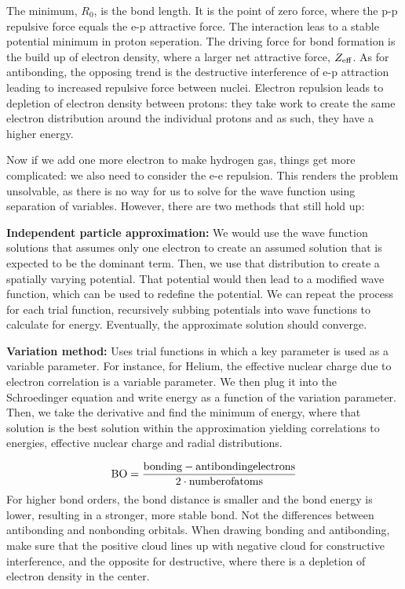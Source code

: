 \documentclass[11pt,fleqn]{book}
\begin{document}
The minimum, $R_0$, is the bond length. It is the point of zero force, where the p-p repulsive force equals the e-p attractive force. The interaction leas to a stable potential minimum in  proton seperation. The driving force for bond formation is the build up of electron density, where a larger net attractive force, $Z_{\rm eff}$. As for antibonding, the opposing trend is the destructive interference of e-p attraction leading to increased repulsive force between nuclei. Electron repulsion leads to depletion of electron density between protons: they take work to create the same electron distribution around the individual protons and as such, they have a higher energy.

Now if we add one more electron to make hydrogen gas, things get more complicated: we also need to consider the e-e repulsion. This renders the problem unsolvable, as there is no way for us to solve for the wave function using separation of variables. However, there are two methods that still hold up:

\textbf{Independent particle approximation: }We would use the wave function solutions that assumes only one electron to create an assumed solution that is expected to be the dominant term. Then, we use that distribution to create a spatially varying potential. That potential would then lead to a modified wave function, which can be used to redefine the potential. We can repeat the process for each trial function, recursively subbing potentials into wave functions to calculate for energy. Eventually, the approximate solution should converge.

\textbf{Variation method: }Uses trial functions in which a key parameter is used as a variable parameter. For instance, for Helium, the effective nuclear charge due to electron correlation is a variable parameter. We then plug it into the Schroedinger equation and write energy as a function of the variation parameter. Then, we take the derivative and find the minimum of energy, where that solution is the best solution within the approximation yielding correlations to energies, effective nuclear charge and radial distributions.

\begin{theorem}
	$${\rm BO}=\frac{\rm bonding-antibonding electrons}{\rm 2\cdot number of atoms}$$
	For higher bond orders, the bond distance is smaller and the bond energy is lower, resulting in a stronger, more stable bond. Not the differences between antibonding and nonbonding orbitals. When drawing bonding and antibonding, make sure that the positive cloud lines up with negative cloud for constructive interference, and the opposite for destructive, where there is a depletion of electron density in the center.
\end{theorem}
\end{document}
